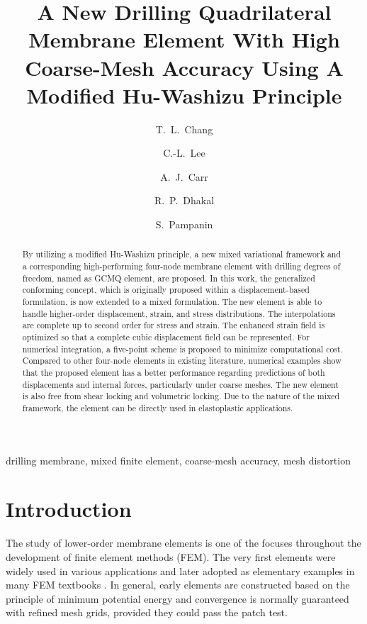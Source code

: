 \documentclass[3p,sort&compress,review,11pt]{elsarticle}
\begin{document}
\begin{abstract}
By utilizing a modified Hu-Washizu principle, a new mixed variational framework and a corresponding high-performing four-node membrane element with drilling degrees of freedom, named as GCMQ element, are proposed. In this work, the generalized conforming concept, which is originally proposed within a displacement-based formulation, is now extended to a mixed formulation. The new element is able to handle higher-order displacement, strain, and stress distributions. The interpolations are complete up to second order for stress and strain. The enhanced strain field is optimized so that a complete cubic displacement field can be represented. For numerical integration, a five-point scheme is proposed to minimize computational cost. Compared to other four-node elements in existing literature, numerical examples show that the proposed element has a better performance regarding predictions of both displacements and internal forces, particularly under coarse meshes. The new element is also free from shear locking and volumetric locking. Due to the nature of the mixed framework, the element can be directly used in elastoplastic applications.
\end{abstract}
\begin{keyword}
drilling membrane\sep
mixed finite element\sep
coarse-mesh accuracy\sep
mesh distortion
\end{keyword}
\begin{frontmatter}
\title{A New Drilling Quadrilateral Membrane Element With High Coarse-Mesh Accuracy Using A Modified Hu-Washizu Principle}
\author[add1]{T.~L.~Chang}
\author[add1]{C.-L.~Lee}
\author[add1]{A.~J.~Carr}
\author[add1]{R.~P.~Dhakal}
\author[add1]{S.~Pampanin}
\address[add1]{Department of Civil and Natural Resources Engineering, University of Canterbury, Christchurch, NZ, 8041.}
\end{frontmatter}
\section{Introduction}
The study of lower-order membrane elements is one of the focuses throughout the development of finite element methods (FEM). The very first elements \citep[e.g.,][]{Turner1956,Taig1964} were widely used in various applications and later adopted as elementary examples in many FEM textbooks \citep[e.g.,][]{Zienkiewicz2013}. In general, early elements are constructed based on the principle of minimum potential energy and convergence is normally guaranteed with refined mesh grids, provided they could pass the patch test.
\end{document}
